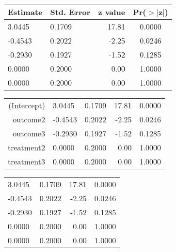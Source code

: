 \begin{table}[ht]
\begin{center}
\begin{tabular}{|llrc}
  \hline
Estimate & Std. Error & z value & Pr($>$$|$z$|$) \\ 
  \hline
3.0445 & 0.1709 & 17.81 & 0.0000 \\ 
  -0.4543 & 0.2022 & -2.25 & 0.0246 \\ 
  -0.2930 & 0.1927 & -1.52 & 0.1285 \\ 
  0.0000 & 0.2000 & 0.00 & 1.0000 \\ 
  0.0000 & 0.2000 & 0.00 & 1.0000 \\ 
   \hline
\end{tabular}
\end{center}
\end{table}
\begin{table}[ht]
\begin{center}
\begin{tabular}{r||llrc}
  \hline
  \hline
(Intercept) & 3.0445 & 0.1709 & 17.81 & 0.0000 \\ 
  outcome2 & -0.4543 & 0.2022 & -2.25 & 0.0246 \\ 
  outcome3 & -0.2930 & 0.1927 & -1.52 & 0.1285 \\ 
  treatment2 & 0.0000 & 0.2000 & 0.00 & 1.0000 \\ 
  treatment3 & 0.0000 & 0.2000 & 0.00 & 1.0000 \\ 
   \hline
\end{tabular}
\end{center}
\end{table}
\begin{table}[ht]
\begin{center}
\begin{tabular}{||llrc}
  \hline
  \hline
3.0445 & 0.1709 & 17.81 & 0.0000 \\ 
  -0.4543 & 0.2022 & -2.25 & 0.0246 \\ 
  -0.2930 & 0.1927 & -1.52 & 0.1285 \\ 
  0.0000 & 0.2000 & 0.00 & 1.0000 \\ 
  0.0000 & 0.2000 & 0.00 & 1.0000 \\ 
   \hline
\end{tabular}
\end{center}
\end{table}
